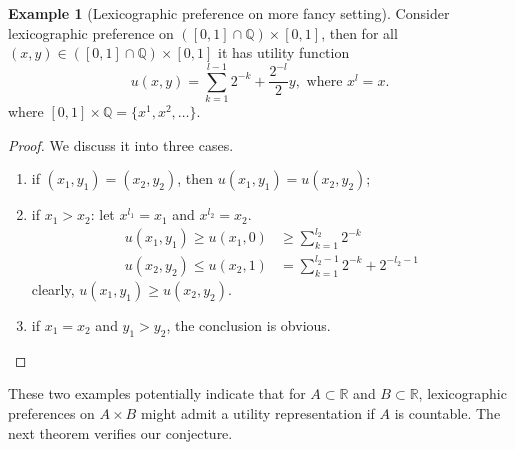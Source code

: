 \documentclass[a4paper, 12pt]{article}
\theoremstyle{definition}
\newtheorem{example}{Example}
\newcommand{\summation}[2]{\sum_{#1}^{#2}}
\begin{document}
\begin{example}[Lexicographic preference on more fancy setting]
Consider lexicographic preference on $([0,1]\cap\mathbb{Q})\times [0,1]$, then for all $(x,y)\in([0,1]\cap\mathbb{Q})\times [0,1]$ it has utility function
\[
u(x,y) = \summation{k=1}{l-1}2^{-k}+\frac{2^{-l}}{2}y,\text{ where }x^l=x.
\]
where $[0,1]\times\mathbb{Q}=\{x^1,x^2,\dots\}$.
\begin{proof}
We discuss it into three cases.
\begin{enumerate}[label = (\roman*)]
\item if $(x_1,y_1)=(x_2,y_2)$, then $u(x_1,y_1) = u(x_2,y_2)$;
\item if $x_1>x_2$: let $x^{l_1}=x_1$ and $x^{l_2}=x_2$. 
\begin{align*}
u(x_1,y_1)\geq u(x_1,0)&\geq \summation{k=1}{l_2}2^{-k}\\
u(x_2,y_2)\leq u(x_2,1)&=\summation{k=1}{l_2-1}2^{-k}+2^{-l_2-1}
\end{align*}
clearly, $u(x_1,y_1)\geq u(x_2,y_2)$.
\item if $x_1=x_2$ and $y_1>y_2$, the conclusion is obvious.
\end{enumerate}
\end{proof}
\end{example}

These two examples potentially indicate that for $A\subset\mathbb{R}$ and $B\subset\mathbb{R}$, lexicographic preferences on $A\times B$ might admit a utility representation if $A$ is countable. The next theorem verifies our conjecture.
\end{document}
